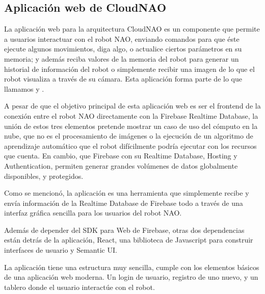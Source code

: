 
\subsection{Aplicación web de CloudNAO}
\label{\detokenize{nao_web:introduccion}}
La aplicación web para la arquitectura CloudNAO es un componente que permite a
usuarios interactuar con el robot NAO, enviando comandos para que éste ejecute
algunos movimientos, diga algo, o actualice ciertos parámetros en su memoria;
y además reciba valores de la memoria del robot para generar un historial
de información del robot o simplemente recibir una imagen de lo que el robot
visualiza a través de su cámara. Esta aplicación forma parte de lo que
llamamos  y .

A pesar de que el objetivo principal de esta aplicación web es ser el
frontend de la conexión entre el robot NAO directamente con la Firebase
Realtime Database, la unión de estos tres elementos pretende
mostrar un caso de uso del cómputo en la nube, que no es el procesamiento de
imágenes o la ejecución de un algoritmo de aprendizaje automático que el robot
difícilmente podría ejecutar con los recursos que cuenta. En cambio,
que Firebase con su Realtime Database, Hosting y Authentication, permiten
generar grandes volúmenes de datos globalmente disponibles, y protegidos.

Como se mencionó, la aplicación es una herramienta que simplemente recibe y envía información de la Realtime Database de
Firebase todo a través de una interfaz gráfica sencilla para los usuarios
del robot NAO.

Además de depender del SDK para Web de Firebase, otras dos dependencias están
detrás de la aplicación, React, una biblioteca de Javascript para construir
interfaces de usuario y Semantic UI.

La aplicación tiene una estructura muy sencilla, cumple con los elementos
básicos de una aplicación web moderna. Un login de usuario, registro de uno
nuevo, y un tablero donde el usuario interactúe con el robot.



